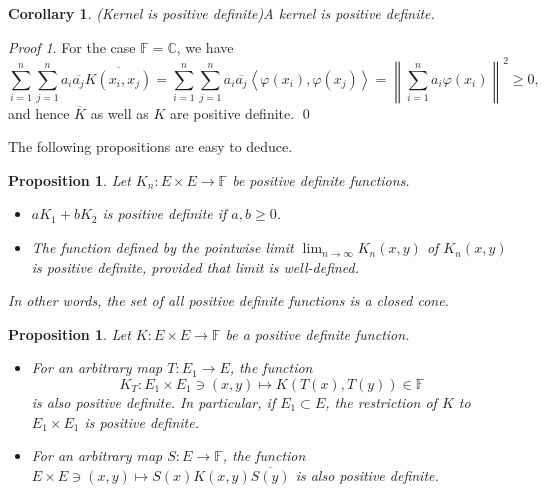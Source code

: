 \documentclass[a4paper,12pt]{article}
\newtheorem{prp}[thm]{Proposition}
\newtheorem{cor}[thm]{Corollary}
\theoremstyle{remark}
\newtheorem*{prf}{Proof}
\theoremstyle{definition}
\newtheorem{rem}[thm]{Remark}
\theoremstyle{definition}
\theoremstyle{definition}
\newcommand{\ip}[2]{\left<#1, #2 \right>}
\newcommand{\norm}[1]{\left\| #1 \right\|}
\newcommand{\ev}[1]{\mathrm{ev}_{#1}}
\newcommand{\adj}[1]{#1^{\star}}
\newcommand{\fin}{\hfill \( \triangleleft \) }
\begin{document}
\begin{cor} (Kernel is positive definite)\label{kernel is pd}
	A kernel is positive definite.
\end{cor}
\begin{prf}
	For the case \( \mathbb{F}=\mathbb{C} \), we have
	\begin{equation*}
		\sum_{i=1}^{n} \sum_{j=1}^{n} a_i \overline{a_j} \overline{K(x_i,x_j)}
		= \sum_{i=1}^{n} \sum_{j=1}^{n} a_i \overline{a_j} \ip{\varphi(x_i)}{\varphi(x_j)}
		= \norm{\sum_{i=1}^{n} a_i \varphi(x_i) }^2 \ge 0,
	\end{equation*}
	and hence \( \overline{K} \) as well as \( K \) are positive definite.
	\qed\end{prf}


The following propositions are easy to deduce.
\begin{prp}
	Let \( K_n : E \times E \to \mathbb{F} \) be positive definite functions.
	\begin{itemize}
		\item[(a)] \( a K_1 + b K_2 \) is positive definite if \( a, b \ge 0 \).
		\item[(b)] The function defined by the pointwise limit \( \lim_{n \to \infty} K_n(x,y) \) of \( K_n(x,y) \) is positive definite, provided that limit is well-defined.
	\end{itemize}
	In other words, the set of all positive definite functions is a closed cone.
\end{prp}

\begin{prp} \label{pd with map is pd}
	Let \( K:E \times E \to \mathbb{F} \) be a positive definite function.
	\begin{itemize}
		\item[(a)] For an arbitrary map \( T:E_1 \to E \), the function
		      \begin{equation*}
			      K_T:E_1 \times E_1 \ni (x,y)  \mapsto K(T(x),T(y)) \in \mathbb{F}
		      \end{equation*}
		      is also positive definite. In particular, if \( E_1 \subset E \), the restriction of \( K \) to \( E_1 \times E_1 \) is positive definite.
		\item[(b)] For an arbitrary map \( S:E \to \mathbb{F} \), the function \(E \times E \ni (x,y) \mapsto  S(x)K(x,y)\overline{S(y)} \) is also positive definite.
	\end{itemize}
\end{prp}
\end{document}

